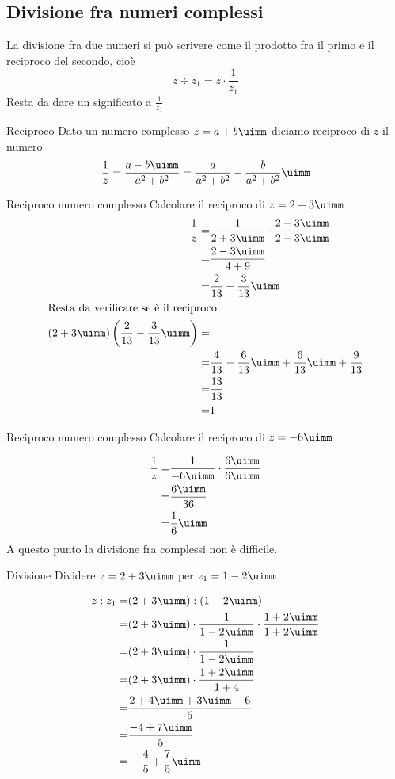 \subsection{Divisione fra numeri complessi}
La divisione fra due numeri si può scrivere come il prodotto fra il primo e il reciproco del secondo, cioè \[z\div z_1=z\cdot\dfrac{1}{z_1}\] Resta da dare un significato a $\frac{1}{z_1}$
\begin{definizionet}{Reciproco}{}
	Dato un numero complesso $z=a+b\uimm $ diciamo reciproco di $z$ il numero \[\dfrac{1}{z}=\dfrac{a-b\uimm}{a^2+b^2}=\dfrac{a}{a^2+b^2}-\dfrac{b}{a^2+b^2}\uimm\]
\end{definizionet}
\begin{esempiot}{Reciproco numero complesso}{}
Calcolare il reciproco di $z=2+3\uimm$
\begin{align*}
\dfrac{1}{z}=&\dfrac{1}{2+3\uimm}\cdot\dfrac{2-3\uimm}{2-3\uimm}\\
=&\dfrac{2-3\uimm}{4+9}\\
=&\dfrac{2}{13}-\dfrac{3}{13}\uimm\\
\intertext{Resta da verificare se è il reciproco}
\left(2+3\uimm\right)\left(\dfrac{2}{13}-\dfrac{3}{13}\uimm\right)=&\\
=&\dfrac{4}{13}-\dfrac{6}{13}\uimm+\dfrac{6}{13}\uimm+\dfrac{9}{13}\\
=&\dfrac{13}{13}\\
=&1\\
\end{align*}
\end{esempiot}
\begin{esempiot}{Reciproco numero complesso}{}
	Calcolare il reciproco di $z=-6\uimm$
\end{esempiot}
\begin{align*}
\dfrac{1}{z}=&\dfrac{1}{-6\uimm}\cdot\dfrac{6\uimm}{6\uimm}\\
=&\dfrac{6\uimm}{36}\\
=&\dfrac{1}{6}\uimm
\end{align*}
A questo punto la divisione fra complessi non è difficile.
\begin{esempiot}{Divisione}{}
Dividere $z=2+3\uimm$ per $z_1=1-2\uimm$
\end{esempiot}
\begin{align*}
z:z_1=&(2+3\uimm):(1-2\uimm)\\
=&(2+3\uimm)\cdot\dfrac{1}{1-2\uimm}\cdot\dfrac{1+2\uimm}{1+2\uimm}\\
=&(2+3\uimm)\cdot\dfrac{1}{1-2\uimm}\\
=&(2+3\uimm)\cdot\dfrac{1+2\uimm}{1+4}\\
=&\dfrac{2+4\uimm+3\uimm-6}{5}\\
=&\dfrac{-4+7\uimm}{5}\\
=&-\dfrac{4}{5}+\dfrac{7}{5}\uimm
\end{align*}

